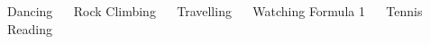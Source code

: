 

\begin{cventries}
\begin{cvitems}
 Dancing ~\cdotp~ Rock Climbing ~\cdotp~ Travelling ~\cdotp~ Watching Formula 1 ~\cdotp~ Tennis ~\cdotp~ Reading
\end{cvitems}


\end{cventries}
